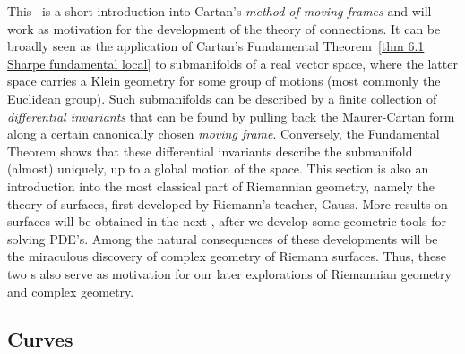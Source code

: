This \sect\ is a short introduction into Cartan's \emph{method of moving frames} and will work as motivation for the development of the theory of connections. It can be broadly seen as the application of Cartan's Fundamental Theorem~\ref{thm 6.1 Sharpe fundamental local} to submanifolds of a real vector space, where the latter space carries a Klein geometry for some group of motions (most commonly the Euclidean group). Such submanifolds can be described by a finite collection of \emph{differential invariants} that can be found by pulling back the Maurer-Cartan form along a certain canonically chosen \emph{moving frame}. Conversely, the Fundamental Theorem shows that these differential invariants describe the submanifold (almost) uniquely, up to a global motion of the space. This section is also an introduction into the most classical part of Riemannian geometry, namely the theory of surfaces, first developed by Riemann's teacher, Gauss. More results on surfaces will be obtained in the next \sect, after we develop some geometric tools for solving PDE's. Among the natural consequences of these developments will be the miraculous  discovery of complex geometry of Riemann surfaces. Thus, these two \sect s also serve as motivation for our later explorations of Riemannian geometry and complex geometry.


\subsection{Curves}


